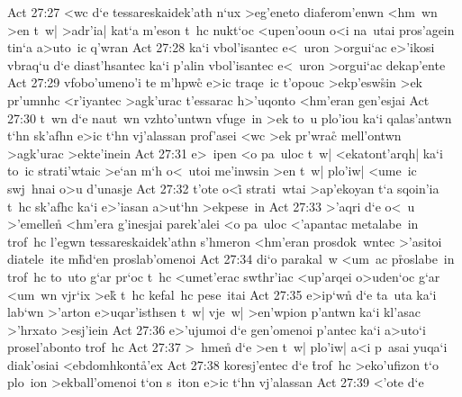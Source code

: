 \vs Act 27:27
<wc
d`e
tessareskaidek'ath
n`ux
>eg'eneto
diaferom'enwn
<hm~wn
>en
t~w|
>adr'ia|
kat`a
m'eson
t~hc
nukt`oc
<upen'ooun
o<i
na~utai
pros'agein
tin`a
a>uto~ic
q'wran\bibvsend
\vs Act 27:28
ka`i
vbol'isantec
e<~uron
>orgui`ac
e>'ikosi
vbraq`u
d`e
diast'hsantec
ka`i
p'alin
vbol'isantec
e<~uron
>orgui`ac
dekap'ente\bibvsend
\vs Act 27:29
vfobo'umeno'i
te
m'hpwc\r{}
e>ic
traqe~ic
t'opouc
>ekp'esw\r{s}in
>ek
pr'umnhc
<r'iyantec
>agk'urac
t'essarac
h>'uqonto
<hm'eran
gen'esjai\bibvsend
\vs Act 27:30
t~wn
d`e
naut~wn
vzhto'untwn
vfuge~in
>ek
to~u
plo'iou
ka`i
qalas'antwn
t`hn
sk'afhn
e>ic
t`hn
vj'alassan
prof'asei
<wc
>ek
pr'wrac\r{}
mell'ontwn
>agk'urac
>ekte'inein\bibvsend
\vs Act 27:31
e>~ipen
<o
pa~uloc
t~w|
<ekatont'arqh|
ka`i
to~ic
strati'wtaic
>e`an
m`h
o<~utoi
me'inwsin
>en
t~w|
plo'iw|
<ume~ic
swj~hnai
o>u
d'unasje\bibvsend
\vs Act 27:32
t'ote
o<i\r{}
strati~wtai
>ap'ekoyan
t`a
sqoin'ia
t~hc
sk'afhc
ka`i
e>'iasan
a>ut`hn
>ekpese~in\bibvsend
\vs Act 27:33
>'aqri
d`e
o<~u
>'emellen\r{}
<hm'era
g'inesjai
parek'alei
<o
pa~uloc
<'apantac
metalabe~in
trof~hc
l'egwn
tessareskaidek'athn
s'hmeron
<hm'eran
prosdok~wntec
>'asitoi
diatele~ite
m\r{h}d`en
proslab'omenoi\bibvsend
\vs Act 27:34
di`o
parakal~w
<um~ac
p\r{r}oslabe~in
trof~hc
to~uto
g`ar
pr`oc
t~hc
<umet'erac
swthr'iac
<up'arqei
o>uden`oc
g`ar
<um~wn
vjr`ix
>ek\r{}
t~hc
kefal~hc
pese~itai\bibvsend
\vs Act 27:35
e>ip`w\r{n}
d`e
ta~uta
ka`i
lab`wn
>'arton
e>uqar'isthsen
t~w|
vje~w|
>en'wpion
p'antwn
ka`i
kl'asac
>'hrxato
>esj'iein\bibvsend
\vs Act 27:36
e>'ujumoi
d`e
gen'omenoi
p'antec
ka`i
a>uto`i
prosel'abonto
trof~hc\bibvsend
\vs Act 27:37
>~hmen\r{}
d`e
>en
t~w|
plo'iw|
a<i
p~asai
yuqa`i
diak'osiai
<ebdomhkont\r{a}'ex\bibvsend
{}
\vs Act 27:38
koresj'entec
d`e
\r{t}rof~hc
>eko'ufizon
t`o
plo~ion
>ekball'omenoi
t`on
s~iton
e>ic
t`hn
vj'alassan\bibvsend
\vs Act 27:39
<'ote
d`e
